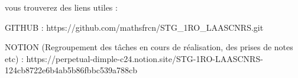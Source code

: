 


vous trouverez des liens utiles :

GITHUB : https://github.com/mathsfrcn/STG_1RO_LAASCNRS.git

NOTION (Regroupement des tâches en cours de réalisation, des prises de notes etc) : https://perpetual-dimple-c24.notion.site/STG-1RO-LAASCNRS-124cb8722e6b4ab5b86fbbc539a788cb

